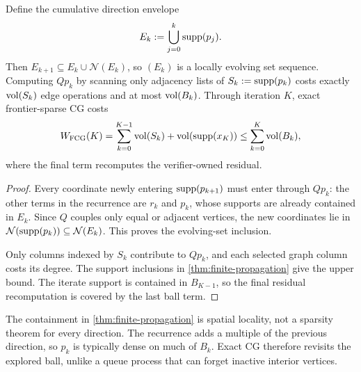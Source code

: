 \documentclass[11pt]{article}
\begin{document}
\begin{corollary}
\label{cor:local-cg-work}
Define the cumulative direction envelope
\begin{equation}
 E_k:=\bigcup_{j=0}^k\operatorname{supp}(p_j).
 \label{eq:cumulative-envelope}
\end{equation}
Then $E_{k+1}\subseteq E_k\cup\mathcal N(E_k)$, so $(E_k)$ is a locally
evolving set sequence. Computing $Qp_k$ by scanning only adjacency lists of
$S_k:=\operatorname{supp}(p_k)$ costs exactly $\operatorname{vol}(S_k)$ edge operations and at most
$\operatorname{vol}(B_k)$. Through iteration $K$, exact frontier-sparse CG costs
\begin{equation}
 W_{\rm FCG}(K)
 =\sum_{k=0}^{K-1}\operatorname{vol}(S_k)+\operatorname{vol}(\operatorname{supp}(x_K))
 \leq\sum_{k=0}^{K}\operatorname{vol}(B_k),
 \label{eq:frontier-work}
\end{equation}
where the final term recomputes the verifier-owned residual.
\end{corollary}

\begin{proof}
Every coordinate newly entering $\operatorname{supp}(p_{k+1})$ must enter through
$Qp_k$: the other terms in the recurrence are $r_k$ and $p_k$, whose supports
are already contained in $E_k$. Since $Q$ couples only equal or adjacent
vertices, the new coordinates lie in $\mathcal N(\operatorname{supp}(p_k))\subseteq
\mathcal N(E_k)$. This proves the evolving-set inclusion.

Only columns indexed by $S_k$ contribute to $Qp_k$, and each selected graph
column costs its degree. The support inclusions in
\cref{thm:finite-propagation} give the upper bound. The iterate support is
contained in $B_{K-1}$, so the final residual recomputation is covered by the
last ball term.
\end{proof}

\begin{remark}
The containment in \cref{thm:finite-propagation} is spatial locality, not a
sparsity theorem for every direction. The recurrence adds a multiple of the
previous direction, so $p_k$ is typically dense on much of $B_k$. Exact CG
therefore revisits the explored ball, unlike a queue process that can forget
inactive interior vertices.
\end{remark}
\end{document}
